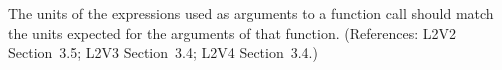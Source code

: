 The units of the expressions used as arguments to a function call
should match the units expected for the arguments of that function.
(References: L2V2 Section~3.5; L2V3 Section~3.4; L2V4 Section~3.4.)
